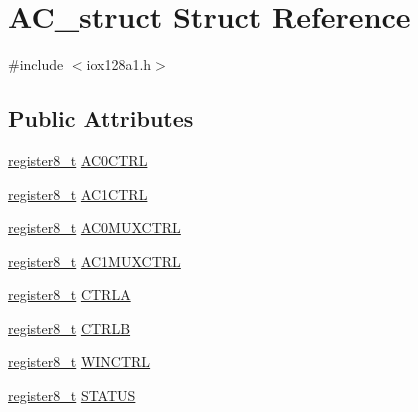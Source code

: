 \hypertarget{struct_a_c__struct}{
\section{AC\_\-struct Struct Reference}
\label{struct_a_c__struct}
}


{\ttfamily \#include $<$iox128a1.h$>$}

\subsection*{Public Attributes}
\begin{DoxyCompactItemize}
\item 
\hyperlink{iox128a1_8h_a6a0649252b392263406882923b04a9db}{register8\_\-t} \hyperlink{struct_a_c__struct_a735749b8d1bb05682d363f3ac4b3f9a7}{AC0CTRL}
\item 
\hyperlink{iox128a1_8h_a6a0649252b392263406882923b04a9db}{register8\_\-t} \hyperlink{struct_a_c__struct_a87a05f04707d487255222f467508dbca}{AC1CTRL}
\item 
\hyperlink{iox128a1_8h_a6a0649252b392263406882923b04a9db}{register8\_\-t} \hyperlink{struct_a_c__struct_a1d590cfc0a8de5ed78d5afe222cadf7e}{AC0MUXCTRL}
\item 
\hyperlink{iox128a1_8h_a6a0649252b392263406882923b04a9db}{register8\_\-t} \hyperlink{struct_a_c__struct_a042c0a43ce91331ff012ec6acf5b7b49}{AC1MUXCTRL}
\item 
\hyperlink{iox128a1_8h_a6a0649252b392263406882923b04a9db}{register8\_\-t} \hyperlink{struct_a_c__struct_aba3a132516f20876ebabdfec5110dbb2}{CTRLA}
\item 
\hyperlink{iox128a1_8h_a6a0649252b392263406882923b04a9db}{register8\_\-t} \hyperlink{struct_a_c__struct_a15795c599244a4e81d354e29cd44c1bb}{CTRLB}
\item 
\hyperlink{iox128a1_8h_a6a0649252b392263406882923b04a9db}{register8\_\-t} \hyperlink{struct_a_c__struct_a7cbcb49f6e967b6dd10d42667fd3aef7}{WINCTRL}
\item 
\hyperlink{iox128a1_8h_a6a0649252b392263406882923b04a9db}{register8\_\-t} \hyperlink{struct_a_c__struct_a151d447d35de8c9678466479ba5f1f4b}{STATUS}
\end{DoxyCompactItemize}


